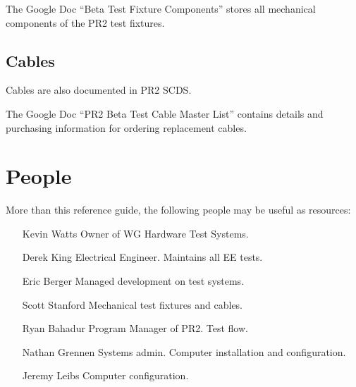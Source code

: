 \documentclass[11pt]{report}
\begin{document}
The Google Doc ``Beta Test Fixture Components'' stores all mechanical components of the PR2 test fixtures.

\section{Cables}

Cables are also documented in PR2 SCDS.

The Google Doc ``PR2 Beta Test Cable Master List'' contains details and purchasing information for ordering replacement cables.


\chapter {People}

More than this reference guide, the following people may be useful as resources:
\begin{itemize}
\item [Kevin Watts] Owner of WG Hardware Test Systems.
\item [Derek King] Electrical Engineer. Maintains all EE tests.
\item [Eric Berger] Managed development on test systems.
\item [Scott Stanford] Mechanical test fixtures and cables.
\item [Ryan Bahadur] Program Manager of PR2. Test flow.
\item [Nathan Grennen] Systems admin. Computer installation and configuration.
\item [Jeremy Leibs] Computer configuration.
\end{itemize}
\end{document}

